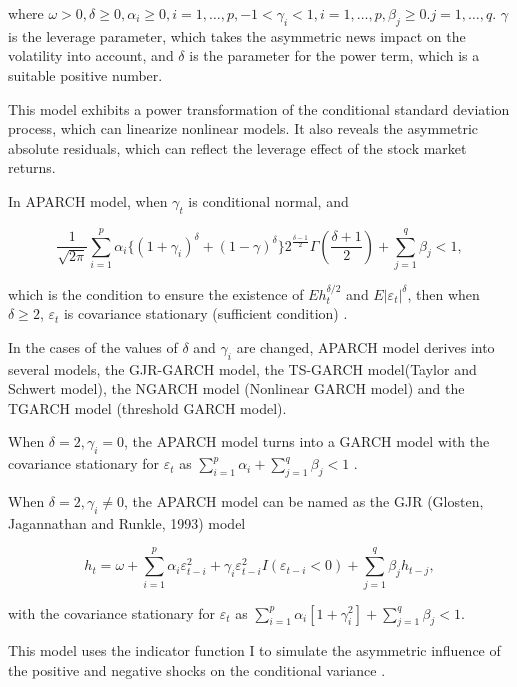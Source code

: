 where $\omega>0, \delta\geq0, \alpha_{i}\geq0, i=1, \ldots, p, -1<\gamma_{i}<1, i=1, \ldots, p, \beta_{j}\geq0.j=1, \ldots, q$. $\gamma$ is the leverage parameter, which takes the asymmetric news impact on the volatility into account,  and $\delta$ is the parameter for the power term, which is a suitable positive number.

This model exhibits a power transformation of the conditional standard deviation process, which can linearize nonlinear models. It also reveals the asymmetric absolute residuals, which can reflect the leverage effect of the stock market returns.


In APARCH model, when $\gamma_{t}$ is conditional normal, and 

\begin{equation}
\frac{1}{\sqrt{2\pi}}\sum_{i=1}^{p}\alpha_{i} \lbrace\left(1 + \gamma_{i} \right)^\delta + (1-\gamma)^{\delta}\rbrace2^{\frac{\delta-1}{2}}\Gamma (\frac{\delta+1}{2}) + \sum_{j=1}^{q}\beta_{j}<1,
\end{equation}

which is the condition to ensure the existence of $Eh_{t}^{\delta/2}$ and $E|\varepsilon_{t}|^{\delta}$, then when $\delta\geq2$, $\varepsilon_t$   is covariance stationary (sufficient condition) \cite{Ding1993}.


In the cases of the values of $\delta$ and $\gamma_{i}$ are changed, APARCH model derives into several models, the GJR-GARCH model, the TS-GARCH model(Taylor and Schwert model), the NGARCH model (Nonlinear GARCH model) and the TGARCH model (threshold GARCH model).

When $\delta=2,\gamma_{i}=0$, the APARCH model turns into a GARCH model with the covariance stationary for  $\varepsilon_{t}$ as $\sum_{i=1}^{p}\alpha_{i} + \sum_{j=1}^{q}\beta_{j}<1$ \cite{Bollerslev1986}.

When $\delta = 2, \gamma_{i}\neq 0$, the APARCH model can be named as the GJR (Glosten, Jagannathan and Runkle, 1993) model 

\begin{equation}
h_{t}=\omega + \sum_{i=1}^{p}\alpha_{i}\varepsilon_{t-i}^{2}+\gamma_{i}\varepsilon_{t-i}^{2}I(\varepsilon_{t-i}<0)+\sum_{j=1}^{q}\beta
_{j}h_{t-j},
\end{equation}

with the  covariance stationary for $\varepsilon_{t}$ as $\sum_{i=1}^{p}\alpha_{i}[1+\gamma_{i}^{2}]+\sum_{j=1}^{q}\beta_{j}<1$.

This model uses the indicator function I to simulate the asymmetric influence of the positive and negative shocks on the conditional variance \cite{Glosten1993}.

